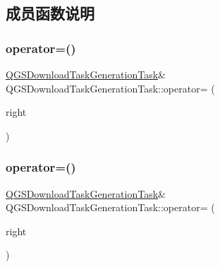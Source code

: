 \subsection{成员函数说明}
\mbox{\label{class_q_g_s_download_task_generation_task_aecc0ef98c127f38d319c635914487a33}} 
\subsubsection{\texorpdfstring{operator=()}{operator=()}\hspace{0.1cm}{\footnotesize\ttfamily [1/2]}}
{\footnotesize\ttfamily \mbox{\hyperlink{class_q_g_s_download_task_generation_task}{Q\+G\+S\+Download\+Task\+Generation\+Task}}\& Q\+G\+S\+Download\+Task\+Generation\+Task\+::operator= (\begin{DoxyParamCaption}\item[{const \mbox{\hyperlink{class_q_g_s_download_task_generation_task}{Q\+G\+S\+Download\+Task\+Generation\+Task}} \&}]{right }\end{DoxyParamCaption})\hspace{0.3cm}{\ttfamily [delete]}}

\mbox{\label{class_q_g_s_download_task_generation_task_adc94c4759cb957d3bbaafc66ffd6f7a2}} 
\subsubsection{\texorpdfstring{operator=()}{operator=()}\hspace{0.1cm}{\footnotesize\ttfamily [2/2]}}
{\footnotesize\ttfamily \mbox{\hyperlink{class_q_g_s_download_task_generation_task}{Q\+G\+S\+Download\+Task\+Generation\+Task}}\& Q\+G\+S\+Download\+Task\+Generation\+Task\+::operator= (\begin{DoxyParamCaption}\item[{\mbox{\hyperlink{class_q_g_s_download_task_generation_task}{Q\+G\+S\+Download\+Task\+Generation\+Task}} \&\&}]{right }\end{DoxyParamCaption})\hspace{0.3cm}{\ttfamily [delete]}}



